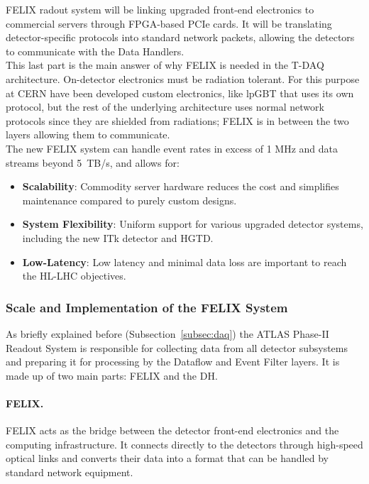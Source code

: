 \acs{FELIX} radout system will be linking upgraded front-end electronics to commercial servers through \acs{FPGA}-based \acs{PCIe} cards. It will be translating detector-specific protocols into standard network packets, allowing the detectors to communicate with the Data Handlers.\\
This last part is the main answer of why \acs{FELIX} is needed in the \acs{T-DAQ} architecture. On-detector electronics must be radiation tolerant. For this purpose at \acs{CERN} have been developed custom electronics, like \acl{lpGBT} \cite{lpgbt} that uses its own protocol, but the rest of the underlying architecture uses normal network protocols since they are shielded from radiations; \acs{FELIX} is in between the two layers allowing them to communicate.\\
The new \acs{FELIX} system can handle event rates in excess of 1 MHz and data streams beyond 5~TB/s, and allows for:
\begin{itemize}
    \item \textbf{Scalability}: Commodity server hardware reduces the cost and simplifies maintenance compared to purely custom designs.
    \item \textbf{System Flexibility}: Uniform support for various upgraded detector systems, including the new \acs{ITk} detector and \acs{HGTD}.
    \item \textbf{Low-Latency}: Low latency and minimal data loss are important to reach the \acs{HL-LHC} objectives.
\end{itemize}

\subsubsection{Scale and Implementation of the \acs{FELIX} System}

As briefly explained before (Subsection~\ref{subsec:daq}) the \acs{ATLAS} Phase-II Readout System is responsible for collecting data from all detector subsystems and preparing it for processing by the Dataflow and Event Filter layers. It is made up of two main parts: \acs{FELIX} and the \acf{DH}.

\paragraph{FELIX.}
\acf{FELIX} acts as the bridge between the detector front-end electronics and the computing infrastructure. It connects directly to the detectors through high-speed optical links and converts their data into a format that can be handled by standard network equipment.

